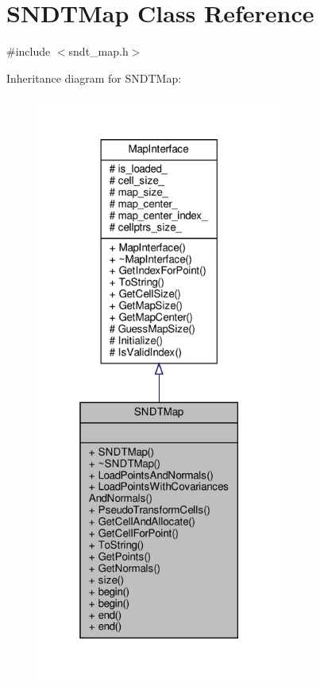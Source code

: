 \hypertarget{classSNDTMap}{}\section{S\+N\+D\+T\+Map Class Reference}
\label{classSNDTMap}


{\ttfamily \#include $<$sndt\+\_\+map.\+h$>$}



Inheritance diagram for S\+N\+D\+T\+Map\+:\nopagebreak
\begin{figure}[H]
\begin{center}
\leavevmode
\includegraphics[height=550pt]{d3/dfa/classSNDTMap__inherit__graph}
\end{center}
\end{figure}


